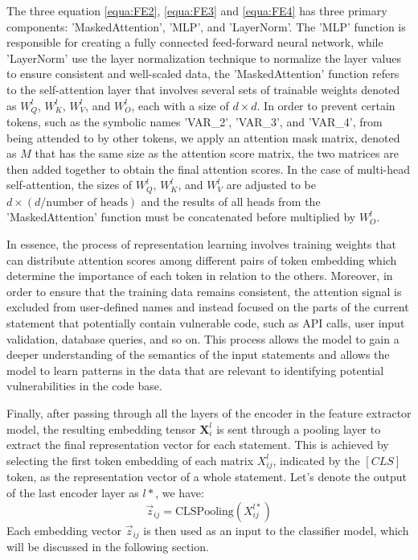 \documentclass{ieeeaccess}
\begin{document}
\par The three equation \ref{equa:FE2}, \ref{equa:FE3} and \ref{equa:FE4} has three primary components: 'MaskedAttention', 'MLP', and 'LayerNorm'. The 'MLP' function is responsible for creating a fully connected feed-forward neural network, while 'LayerNorm'  use the layer normalization technique \cite{layer_norm} to normalize the layer values to ensure consistent and well-scaled data, the 'MaskedAttention' function refers to the self-attention layer that involves several sets of trainable weights denoted as $W_Q^l$, $W_K^l$, $W_V^l$, and $W_O^l$, each with a size of $d \times d$.  In order to prevent certain tokens, such as the symbolic names 'VAR\_2', 'VAR\_3', and 'VAR\_4', from being attended to by other tokens, we apply an attention mask matrix, denoted as $M$  that has the same size as the attention score matrix,  the two matrices are then added together to obtain the final attention scores. In the case of multi-head self-attention, the sizes of $W_Q^l$, $W_K^l$, and $W_V^l$ are adjusted to be $d \times (d/\text{number of heads})$ and the results of all heads from the 'MaskedAttention' function must be concatenated before multiplied by $W_O^l$.

\par In essence, the process of representation learning involves training weights that can distribute attention scores among different pairs of token embedding which determine the importance of each token in relation to the others.  Moreover, in order to ensure that the training data remains consistent, the attention signal is excluded from user-defined names and instead focused on the parts of the current statement that potentially contain vulnerable code, such as API calls, user input validation, database queries, and so on. This process allows the model  to gain a deeper understanding of the semantics of the input statements and allows the model to learn patterns in the data that are relevant to identifying potential vulnerabilities in the code base. 

\par Finally, after passing through all the layers of the encoder in the feature extractor model, the resulting embedding tensor $\mathbf{X}_i^l$ is sent through a pooling layer to extract the final representation vector for each statement. This is achieved by selecting the first token embedding of each matrix $X^l_{ij}$, indicated by the $[CLS]$ token, as the representation vector of a whole statement. Let's denote the output of the last encoder layer as $l*$, we have:
\begin{equation}\Vec{z}_{ij} = \text{CLSPooling}(X^{l*}_{ij})\end{equation}
Each embedding vector $\Vec{z}_{ij}$ is then used as an input to the classifier model, which will be discussed in the following section.
\end{document}
